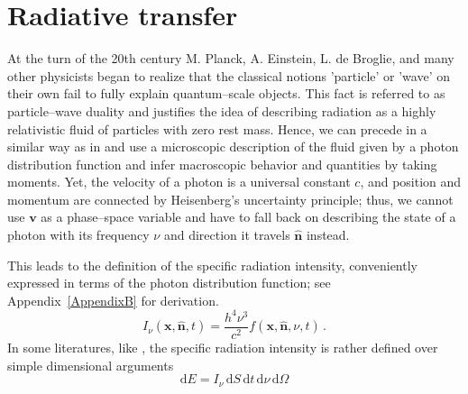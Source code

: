 \section{Radiative transfer}
\label{sec:RadiativeTransfer}
At the turn of the 20th century M. Planck, A. Einstein, L. de Broglie, and many other physicists began to realize that the classical notions 'particle' or 'wave' on their own fail to fully explain quantum--scale objects.
This fact is referred to as particle--wave duality and justifies the idea of describing radiation as a highly relativistic fluid of particles with zero rest mass.
Hence, we can precede in a similar way as in  and use a microscopic description of the fluid given by a photon distribution function and infer macroscopic behavior and quantities by taking moments.
Yet, the velocity of a photon is a universal constant $c$, and position and momentum are connected by Heisenberg's uncertainty principle; thus, we cannot use $\textbf{v}$ as a phase--space variable and have to fall back on describing the state of a photon with its frequency $\nu$ and direction it travels $\hat{\textbf{n}}$ instead.

This leads to the definition of the specific radiation intensity, conveniently expressed in terms of the photon distribution function; see Appendix~\ref{AppendixB} for derivation.
\begin{equation}
  I_{\nu}(\textbf{x}, \hat{\textbf{n}}, t) = \frac{h^{4}\nu^{3}}{c^{2}} f(\textbf{x}, \hat{\textbf{n}}, \nu, t)\,.
\label{eq:spec_intensity}
\end{equation}
In some literatures, like \citet{Rybicki_Lightman}, the specific radiation intensity is rather defined over simple dimensional arguments
\begin{equation}
 \mathrm{d}E = I_{\nu}\,\mathrm{d}S\,\mathrm{d}t\,\mathrm{d}\nu\,\mathrm{d}\Omega
\label{eq:dE_intensity}
\end{equation}


